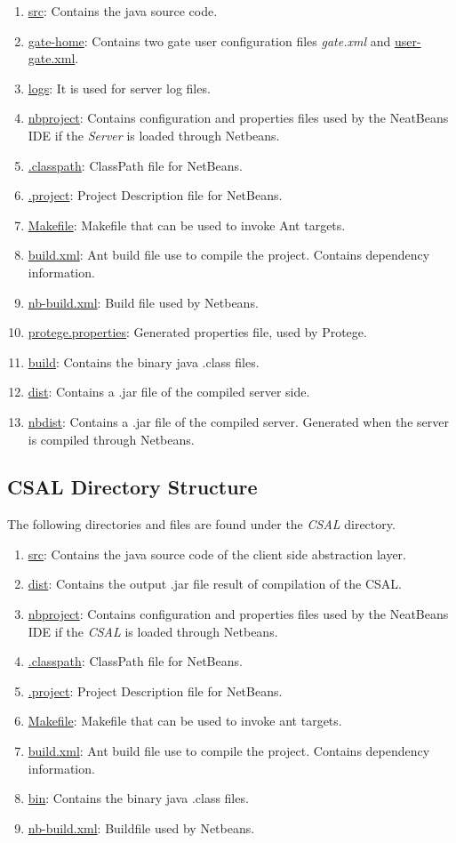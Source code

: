 \begin{enumerate}
\item \url{src}: Contains the java source code.
\item \url{gate-home}: Contains two gate user configuration files \emph{gate.xml} and \url{user-gate.xml}.
\item \url{logs}: It is used for server log files.
\item \url{nbproject}: Contains configuration and properties files used by the NeatBeans IDE if the \emph{Server} is loaded through Netbeans.
\item \url{.classpath}: ClassPath file for NetBeans.
\item \url{.project}: Project Description file for NetBeans.
\item \url{Makefile}: Makefile that can be used to invoke Ant targets.
\item \url{build.xml}: Ant build file use to compile the project. Contains dependency information.
\item \url{nb-build.xml}: Build file used by Netbeans.
\item \url{protege.properties}: Generated properties file, used by Protege.
\item \url{build}: Contains the binary java .class files.
\item \url{dist}: Contains a .jar file of the compiled server side.
\item \url{nbdist}: Contains a .jar file of the compiled server. Generated when the server is compiled through Netbeans.
\end{enumerate}


\subsection{CSAL Directory Structure}
The following directories and files are found under the \emph{CSAL} directory.

\begin{enumerate}
\item \url{src}: Contains the java source code of the client side abstraction layer.
\item \url{dist}: Contains the output .jar file result of compilation of the CSAL.
\item \url{nbproject}: Contains configuration and properties files used by the NeatBeans IDE if the \emph{CSAL} is loaded through Netbeans.
\item \url{.classpath}: ClassPath file for NetBeans.
\item \url{.project}: Project Description file for NetBeans.
\item \url{Makefile}: Makefile that can be used to invoke ant targets.
\item \url{build.xml}: Ant build file use to compile the project. Contains dependency information.
\item \url{bin}: Contains the binary java .class files.
\item \url{nb-build.xml}: Buildfile used by Netbeans.
\end{enumerate}


